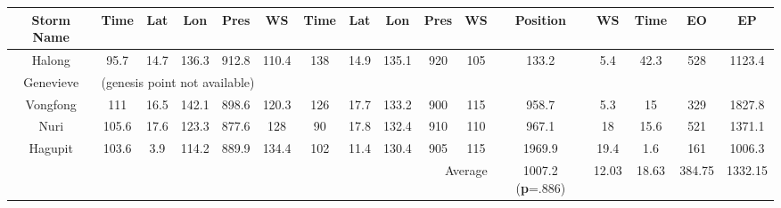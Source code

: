 \documentclass[a4paper, 12pt]{article}
\begin{document}
{\begin{table}[!htpb]
\begin{center}
\begin{tabular}{c||c|c|c|c|c||c|c|c|c|c||c|c|c||c|c|}
\multicolumn{1}{|m{.15in}||}{Storm Name} & Time & Lat & Lon & Pres & WS & Time & Lat & Lon & Pres & WS & Position & WS & Time & EO & EP \\
\hline
\multicolumn{1}{|c||}{Halong} & 95.7 & 14.7 & 136.3 & 912.8 & 110.4 & 138 & 14.9 & 135.1 & 920 & 105 & 133.2 & 5.4 & 42.3 & 528 & 1123.4\\
\hline
\multicolumn{1}{|c||}{Genevieve} & \multicolumn{15}{|l|}{(genesis point not available)}\\
\hline
\multicolumn{1}{|c||}{Vongfong} & 111 & 16.5 & 142.1 & 898.6 & 120.3 & 126 & 17.7 & 133.2 & 900 & 115 & 958.7 & 5.3 & 15 & 329  & 1827.8\\
\hline
\multicolumn{1}{|c||}{Nuri} & 105.6 & 17.6 & 123.3 & 877.6 & 128 & 90 & 17.8 & 132.4 & 910 & 110 & 967.1 & 18 & 15.6 & 521  & 1371.1\\
\hline
\multicolumn{1}{|c||}{Hagupit} & 103.6 & 3.9 & 114.2 & 889.9 & 134.4 & 102 & 11.4 & 130.4 & 905 & 115 & 1969.9 & 19.4& 1.6 & 161 & 1006.3\\\hline\hline
\multicolumn{11}{|r||}{Average}&\multicolumn{1}{|m{.2in}|}{\vspace{.1in} 1007.2 \hspace{.5in} ({\bf p}=.886)}  &12.03 &18.63&384.75&1332.15\\\hline
\end{tabular}
\end{center}
\vspace{3in}
\end{table}







\newpage

}
\end{document}
